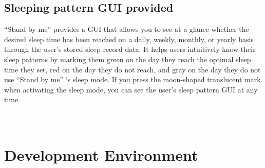 \documentclass[conference]{IEEEtran}
\begin{document}
\subsection{Sleeping pattern GUI provided}
“Stand by me” provides a GUI that allows you to see at a glance whether the desired sleep time has been reached on a daily, weekly, monthly, or yearly basis through the user's stored sleep record data. It helps users intuitively know their sleep patterns by marking them green on the day they reach the optimal sleep time they set, red on the day they do not reach, and gray on the day they do not use “Stand by me” ‘s sleep mode. If you press the moon-shaped translucent mark when activating the sleep mode, you can see the user's sleep pattern GUI at any time.
\\
\\
\\
\section{Development Environment}
\vspace{1\baselineskip}
\end{document}
